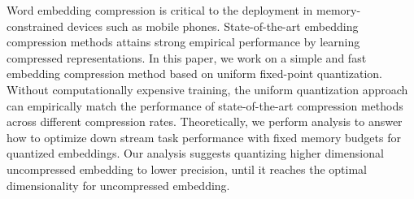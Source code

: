 Word embedding compression is critical to the deployment in memory-constrained devices such as mobile phones. State-of-the-art embedding compression methods attains strong empirical performance by learning compressed representations. In this paper, we work on a simple and fast embedding compression method based on uniform fixed-point quantization. 
Without computationally expensive training, the uniform quantization approach can empirically match the performance of state-of-the-art compression methods across different compression rates. 
Theoretically, we perform analysis to answer how to optimize down stream task performance with fixed memory budgets for quantized embeddings. Our analysis suggests quantizing higher dimensional uncompressed embedding to lower precision, until it reaches the optimal dimensionality for uncompressed embedding.
	

